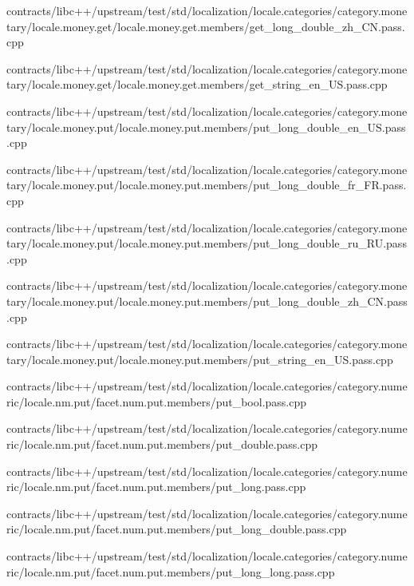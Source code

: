 \begin{DoxyCompactItemize}
contracts/libc++/upstream/test/std/localization/locale.\+categories/category.\+monetary/locale.\+money.\+get/locale.\+money.\+get.\+members/get\+\_\+long\+\_\+double\+\_\+zh\+\_\+\+C\+N.\+pass.\+cpp\item 
contracts/libc++/upstream/test/std/localization/locale.\+categories/category.\+monetary/locale.\+money.\+get/locale.\+money.\+get.\+members/get\+\_\+string\+\_\+en\+\_\+\+U\+S.\+pass.\+cpp\item 
contracts/libc++/upstream/test/std/localization/locale.\+categories/category.\+monetary/locale.\+money.\+put/locale.\+money.\+put.\+members/put\+\_\+long\+\_\+double\+\_\+en\+\_\+\+U\+S.\+pass.\+cpp\item 
contracts/libc++/upstream/test/std/localization/locale.\+categories/category.\+monetary/locale.\+money.\+put/locale.\+money.\+put.\+members/put\+\_\+long\+\_\+double\+\_\+fr\+\_\+\+F\+R.\+pass.\+cpp\item 
contracts/libc++/upstream/test/std/localization/locale.\+categories/category.\+monetary/locale.\+money.\+put/locale.\+money.\+put.\+members/put\+\_\+long\+\_\+double\+\_\+ru\+\_\+\+R\+U.\+pass.\+cpp\item 
contracts/libc++/upstream/test/std/localization/locale.\+categories/category.\+monetary/locale.\+money.\+put/locale.\+money.\+put.\+members/put\+\_\+long\+\_\+double\+\_\+zh\+\_\+\+C\+N.\+pass.\+cpp\item 
contracts/libc++/upstream/test/std/localization/locale.\+categories/category.\+monetary/locale.\+money.\+put/locale.\+money.\+put.\+members/put\+\_\+string\+\_\+en\+\_\+\+U\+S.\+pass.\+cpp\item 
contracts/libc++/upstream/test/std/localization/locale.\+categories/category.\+numeric/locale.\+nm.\+put/facet.\+num.\+put.\+members/put\+\_\+bool.\+pass.\+cpp\item 
contracts/libc++/upstream/test/std/localization/locale.\+categories/category.\+numeric/locale.\+nm.\+put/facet.\+num.\+put.\+members/put\+\_\+double.\+pass.\+cpp\item 
contracts/libc++/upstream/test/std/localization/locale.\+categories/category.\+numeric/locale.\+nm.\+put/facet.\+num.\+put.\+members/put\+\_\+long.\+pass.\+cpp\item 
contracts/libc++/upstream/test/std/localization/locale.\+categories/category.\+numeric/locale.\+nm.\+put/facet.\+num.\+put.\+members/put\+\_\+long\+\_\+double.\+pass.\+cpp\item 
contracts/libc++/upstream/test/std/localization/locale.\+categories/category.\+numeric/locale.\+nm.\+put/facet.\+num.\+put.\+members/put\+\_\+long\+\_\+long.\+pass.\+cpp\item 

\end{DoxyCompactItemize}

